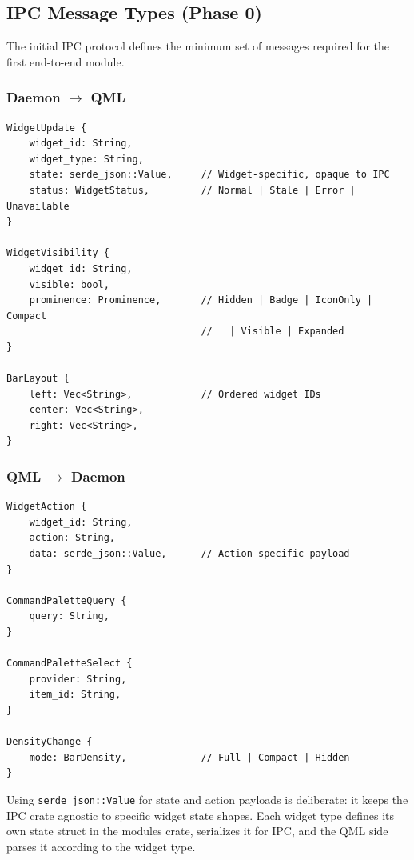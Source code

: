 \documentclass[11pt,a4paper]{article}
\begin{document}
\subsection{IPC Message Types (Phase 0)}
\label{sec:ipc-messages}

The initial IPC protocol defines the minimum set of messages required for the first end-to-end module.

\subsubsection{Daemon $\to$ QML}

\begin{lstlisting}[language={}]
WidgetUpdate {
    widget_id: String,
    widget_type: String,
    state: serde_json::Value,     // Widget-specific, opaque to IPC
    status: WidgetStatus,         // Normal | Stale | Error | Unavailable
}

WidgetVisibility {
    widget_id: String,
    visible: bool,
    prominence: Prominence,       // Hidden | Badge | IconOnly | Compact
                                  //   | Visible | Expanded
}

BarLayout {
    left: Vec<String>,            // Ordered widget IDs
    center: Vec<String>,
    right: Vec<String>,
}
\end{lstlisting}

\subsubsection{QML $\to$ Daemon}

\begin{lstlisting}[language={}]
WidgetAction {
    widget_id: String,
    action: String,
    data: serde_json::Value,      // Action-specific payload
}

CommandPaletteQuery {
    query: String,
}

CommandPaletteSelect {
    provider: String,
    item_id: String,
}

DensityChange {
    mode: BarDensity,             // Full | Compact | Hidden
}
\end{lstlisting}

Using \texttt{serde\_json::Value} for state and action payloads is deliberate: it keeps the IPC crate agnostic to specific widget state shapes. Each widget type defines its own state struct in the modules crate, serializes it for IPC, and the QML side parses it according to the widget type.
\end{document}
